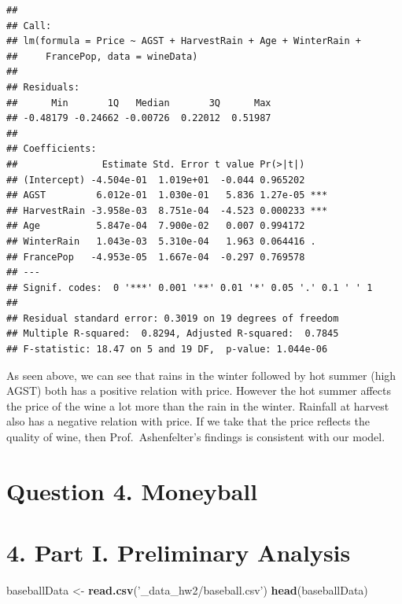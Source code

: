 \documentclass[
]{article}
\newenvironment{Shaded}{\begin{snugshade}}{\end{snugshade}}
\newcommand{\KeywordTok}[1]{\textcolor[rgb]{0.13,0.29,0.53}{\textbf{#1}}}
\newcommand{\NormalTok}[1]{#1}
\newcommand{\StringTok}[1]{\textcolor[rgb]{0.31,0.60,0.02}{#1}}
\begin{document}
\begin{verbatim}
## 
## Call:
## lm(formula = Price ~ AGST + HarvestRain + Age + WinterRain + 
##     FrancePop, data = wineData)
## 
## Residuals:
##      Min       1Q   Median       3Q      Max 
## -0.48179 -0.24662 -0.00726  0.22012  0.51987 
## 
## Coefficients:
##               Estimate Std. Error t value Pr(>|t|)    
## (Intercept) -4.504e-01  1.019e+01  -0.044 0.965202    
## AGST         6.012e-01  1.030e-01   5.836 1.27e-05 ***
## HarvestRain -3.958e-03  8.751e-04  -4.523 0.000233 ***
## Age          5.847e-04  7.900e-02   0.007 0.994172    
## WinterRain   1.043e-03  5.310e-04   1.963 0.064416 .  
## FrancePop   -4.953e-05  1.667e-04  -0.297 0.769578    
## ---
## Signif. codes:  0 '***' 0.001 '**' 0.01 '*' 0.05 '.' 0.1 ' ' 1
## 
## Residual standard error: 0.3019 on 19 degrees of freedom
## Multiple R-squared:  0.8294, Adjusted R-squared:  0.7845 
## F-statistic: 18.47 on 5 and 19 DF,  p-value: 1.044e-06
\end{verbatim}

As seen above, we can see that rains in the winter followed by hot
summer (high AGST) both has a positive relation with price. However the
hot summer affects the price of the wine a lot more than the rain in the
winter. Rainfall at harvest also has a negative relation with price. If
we take that the price reflects the quality of wine, then
Prof.~Ashenfelter's findings is consistent with our model.

\hypertarget{question-4.-moneyball}{%
\section{Question 4. Moneyball}\label{question-4.-moneyball}}

\hypertarget{part-i.-preliminary-analysis-1}{%
\section{4. Part I. Preliminary
Analysis}\label{part-i.-preliminary-analysis-1}}

\begin{Shaded}
\begin{Highlighting}[]
\NormalTok{baseballData <-}\StringTok{ }\KeywordTok{read.csv}\NormalTok{(}\StringTok{'_data_hw2/baseball.csv'}\NormalTok{)}
\KeywordTok{head}\NormalTok{(baseballData)}
\end{Highlighting}
\end{Shaded}
\end{document}
